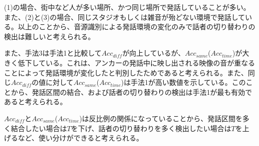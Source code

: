 (1)の場合、街中など人が多い場所、かつ同じ場所で発話していることが多い。また、(2)と(3)の場合、同じスタジオもしくは雑音が殆どない環境で発話している。以上のことから、音源識別による発話環境の変化のみで話者の切り替わりの検出は難しいと考えられる。\par
また、手法3は手法1と比較して$Acc_{diff}$が向上しているが、$Acc_{same}$($Acc_{time}$)が大きく低下している。これは、アンカーの発話中に映し出される映像の音が重なることによって発話環境が変化したと判別したためであると考えられる。また、同じ$Acc_{diff}$の値に対して$Acc_{same}$($Acc_{time}$)は手法1が高い数値を示している。このことから、発話区間の結合、および話者の切り替わりの検出は手法1が最も有効であると考えられる。\par
$Acc_{diff}$と$Acc_{same}$($Acc_{time}$)は反比例の関係になっていることから、発話区間を多く結合したい場合は$T$を下げ、話者の切り替わりを多く検出したい場合は$T$を上げるなど、使い分けができると考えられる。
